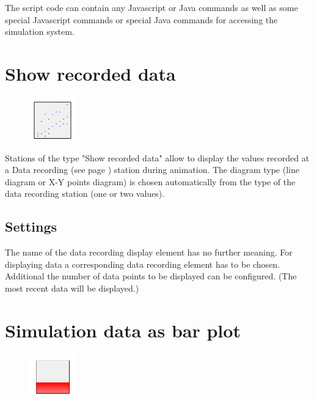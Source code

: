 The script code can contain any Javascript or Java commands as well as some
special Javascript commands or special Java commands 
for accessing the simulation system.


\section{Show recorded data}
\label{ref:ModelElementAnimationRecord}

\begin{figure}
\vspace{-22pt}
\includegraphics[width=2cm]{imageModelElementAnimationRecord.png}
\vspace{-22pt}
\end{figure}

Stations of the type "Show recorded data" allow to display the values
recorded at a Data recording (see page \pageref{ref:ModelElementRecord}) station
during animation. The diagram type (line diagram or X-Y points diagram) is
chosen automatically from the type of the data recording station (one or two values).

\subsection*{Settings}

The name of the data recording display element has no further meaning. For
displaying data a corresponding data recording element has to be chosen.
Additional the number of data points to be displayed can be configured.
(The most recent data will be displayed.)


\section{Simulation data as bar plot}
\label{ref:ModelElementAnimationBar}

\begin{figure}
\vspace{-22pt}
\includegraphics[width=2cm]{imageModelElementAnimationBar.png}
\vspace{-22pt}
\end{figure}

